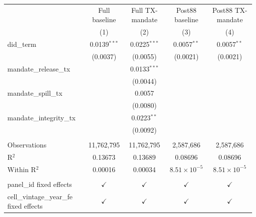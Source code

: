 
\begingroup
\centering
\begin{tabular}{lcccc}
   \toprule
                                            & Full baseline  & Full TX-mandate & Post88 baseline       & Post88 TX-mandate \\   
                                            & (1)            & (2)             & (3)                   & (4)\\  
   \midrule 
   did\_term                                & 0.0139$^{***}$ & 0.0225$^{***}$  & 0.0057$^{**}$         & 0.0057$^{**}$\\   
                                            & (0.0037)       & (0.0055)        & (0.0021)              & (0.0021)\\   
   mandate\_release\_tx                     &                & 0.0133$^{***}$  &                       &   \\   
                                            &                & (0.0044)        &                       &   \\   
   mandate\_spill\_tx                       &                & 0.0057          &                       &   \\   
                                            &                & (0.0080)        &                       &   \\   
   mandate\_integrity\_tx                   &                & 0.0223$^{**}$   &                       &   \\   
                                            &                & (0.0092)        &                       &   \\   
    \\
   Observations                             & 11,762,795     & 11,762,795      & 2,587,686             & 2,587,686\\  
   R$^2$                                    & 0.13673        & 0.13689         & 0.08696               & 0.08696\\  
   Within R$^2$                             & 0.00016        & 0.00034         & $8.51\times 10^{-5}$  & $8.51\times 10^{-5}$\\   
    \\
   panel\_id fixed effects                  & $\checkmark$   & $\checkmark$    & $\checkmark$          & $\checkmark$\\   
   cell\_vintage\_year\_fe fixed effects    & $\checkmark$   & $\checkmark$    & $\checkmark$          & $\checkmark$\\   
   \bottomrule
\end{tabular}
\par\endgroup


